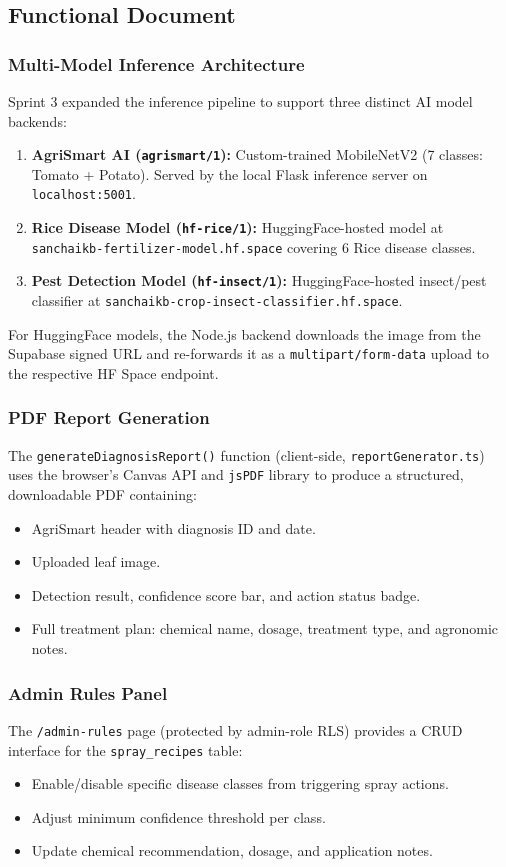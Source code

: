 \documentclass[12pt,a4paper]{report}
\begin{document}
\subsection{Functional Document}

\subsubsection{Multi-Model Inference Architecture}
Sprint 3 expanded the inference pipeline to support three distinct AI model backends:

\begin{enumerate}
  \item \textbf{AgriSmart AI (\texttt{agrismart/1}):} Custom-trained MobileNetV2 (7 classes: Tomato + Potato). Served by the local Flask inference server on \texttt{localhost:5001}.
  \item \textbf{Rice Disease Model (\texttt{hf-rice/1}):} HuggingFace-hosted model at \texttt{sanchaikb-fertilizer-model.hf.space} covering 6 Rice disease classes.
  \item \textbf{Pest Detection Model (\texttt{hf-insect/1}):} HuggingFace-hosted insect/pest classifier at \texttt{sanchaikb-crop-insect-classifier.hf.space}.
\end{enumerate}

For HuggingFace models, the Node.js backend downloads the image from the Supabase signed URL and re-forwards it as a \texttt{multipart/form-data} upload to the respective HF Space endpoint.

\subsubsection{PDF Report Generation}
The \texttt{generateDiagnosisReport()} function (client-side, \texttt{reportGenerator.ts}) uses the browser's Canvas API and \texttt{jsPDF} library to produce a structured, downloadable PDF containing:
\begin{itemize}
  \item AgriSmart header with diagnosis ID and date.
  \item Uploaded leaf image.
  \item Detection result, confidence score bar, and action status badge.
  \item Full treatment plan: chemical name, dosage, treatment type, and agronomic notes.
\end{itemize}

\subsubsection{Admin Rules Panel}
The \texttt{/admin-rules} page (protected by admin-role RLS) provides a CRUD interface for the \texttt{spray\_recipes} table:
\begin{itemize}
  \item Enable/disable specific disease classes from triggering spray actions.
  \item Adjust minimum confidence threshold per class.
  \item Update chemical recommendation, dosage, and application notes.
\end{itemize}
\end{document}
